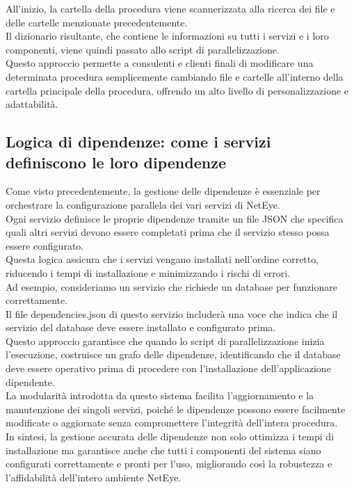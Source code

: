 All'inizio, la cartella della procedura viene scannerizzata alla ricerca dei
file e delle cartelle menzionate precedentemente.\\ Il dizionario risultante, che
contiene le informazioni su tutti i servizi e i loro componenti, viene quindi
passato allo script di parallelizzazione.\\ Questo approccio permette a
consulenti e clienti finali di modificare una determinata procedura
semplicemente cambiando file e cartelle all'interno della cartella principale
della procedura, offrendo un alto livello di personalizzazione e adattabilità.

\subsection{Logica di dipendenze: come i servizi definiscono le loro dipendenze}
\label{sub:dipendenze}

Come visto precedentemente, la gestione delle dipendenze è essenziale per orchestrare
la configurazione parallela dei vari servizi di NetEye.\\ Ogni servizio definisce
le proprie dipendenze tramite un file JSON che specifica quali altri servizi devono
essere completati prima che il servizio stesso possa essere configurato.\\ Questa
logica assicura che i servizi vengano installati nell'ordine corretto, riducendo
i tempi di installazione e minimizzando i rischi di errori.\\ Ad esempio, consideriamo
un servizio che richiede un database per funzionare correttamente.\\ Il file dependencies.json
di questo servizio includerà una voce che indica che il servizio del database deve
essere installato e configurato prima.\\ Questo approccio garantisce che quando lo
script di parallelizzazione inizia l'esecuzione, costruisce un grafo delle
dipendenze, identificando che il database deve essere operativo prima di procedere
con l'installazione dell'applicazione dipendente.\\ La modularità introdotta da questo
sistema facilita l'aggiornamento e la manutenzione dei singoli servizi, poiché
le dipendenze possono essere facilmente modificate o aggiornate senza
compromettere l'integrità dell'intera procedura.\\ In sintesi, la gestione accurata
delle dipendenze non solo ottimizza i tempi di installazione ma garantisce anche
che tutti i componenti del sistema siano configurati correttamente e pronti per l'uso,
migliorando così la robustezza e l'affidabilità dell'intero ambiente NetEye.

